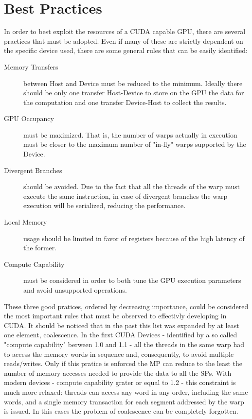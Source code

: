 \section{Best Practices}
In order to best exploit the resources of a CUDA capable GPU, there are several practices that must be adopted. Even if many of these are strictly dependent on the specific device used, there are some general rules that can be easily identified:
\begin{description}
\item[Memory Transfers] between Host and Device must be reduced to the minimum. Ideally there should be only one transfer Host-Device to store on the GPU the data for the computation and one transfer Device-Host to collect the results.
\item[GPU Occupancy] must be maximized. That is, the number of warps actually in execution must be closer to the maximum number of "in-fly" warps supported by the Device.
\item[Divergent Branches] should be avoided. Due to the fact that all the threads of the warp must execute the same instruction, in case of divergent branches the warp execution will be serialized, reducing the performance.
\item[Local Memory] usage should be limited in favor of registers because of the high latency of the former.  
\item[Compute Capability] must be considered in order to both tune the GPU execution parameters and avoid unsupported operations.
\end{description}
These three good pratices, ordered by decreasing importance, could be considered the most important rules that must be observed to effectivly developing in CUDA. It should be noticed that in the past this list was expanded by at least one element, coalescence. In the first CUDA Devices - identified by a so called "compute capability" berween 1.0 and 1.1 - all the threads in the same warp had to access the memory words in sequence and, consequently, to avoid multiple reads/writes. Only if this pratice is enforced the MP can reduce to the least the number of memory accesses needed to provide the data to all the SPs. With modern devices - compute capability grater or equal to 1.2 - this constraint is much more relaxed: threads can access any word in any order, including the same words, and a single memory transaction for each segment addressed by the warp is issued. In this cases the problem of coalescence can be completely forgotten.
